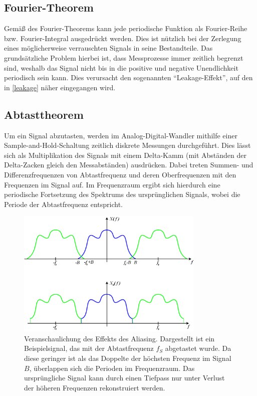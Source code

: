 \documentclass[
a4paper,
12pt,
pagesize,
ngerman
]{scrartcl}
\begin{document}
	\subsection{Fourier-Theorem}
	Gemäß des Fourier-Theorems kann jede periodische Funktion als Fourier-Reihe bzw. Fourier-Integral ausgedrückt werden.
	Dies ist nützlich bei der Zerlegung eines möglicherweise verrauschten Signals in seine Bestandteile.
	Das grundsätzliche Problem hierbei ist, dass Messprozesse immer zeitlich begrenzt sind, weshalb das Signal nicht bis in die positive und negative Unendlichkeit periodisch sein kann.
	Dies verursacht den sogenannten \enquote{Leakage-Effekt}, auf den in \cref{leakage} näher eingegangen wird.
	
	\subsection{Abtasttheorem}
	Um ein Signal abzutasten, werden im Analog-Digital-Wandler mithilfe einer Sample-and-Hold-Schaltung zeitlich diskrete Messungen durchgeführt.
	Dies lässt sich als Multiplikation des Signals mit einem Delta-Kamm (mit Abständen der Delta-Zacken gleich den Messabständen) ausdrücken.
	Dabei treten Summen- und Differenzfrequenzen von Abtastfrequenz und deren Oberfrequenzen mit den Frequenzen im Signal auf.
	Im Frequenzraum ergibt sich hierdurch eine periodische Fortsetzung des Spektrums des ursprünglichen Signals, wobei die Periode der Abtastfrequenz entspricht.
	
	\begin{figure}[H]  
		\includegraphics[width=0.8\textwidth]{EIRE2018Dateien/sonstige_Dateien/AliasedSpectrum}
		\centering
		\caption{
			Veranschaulichung des Effekts des Aliasing. Dargestellt ist ein Beispielsignal, das mit der Abtastfrequenz $f_S$ abgetastet wurde.
			Da diese geringer ist als das Doppelte der höchsten Frequenz im Signal $B$, überlappen sich die Perioden im Frequenzraum.
			Das ursprüngliche Signal kann durch einen Tiefpass nur unter Verlust der höheren Frequenzen rekonstruiert werden. \cite{Aliasing}
		}
		\label{fig_Aliasing_veranschaulichung}
		\centering
	\end{figure}
	
\end{document}
